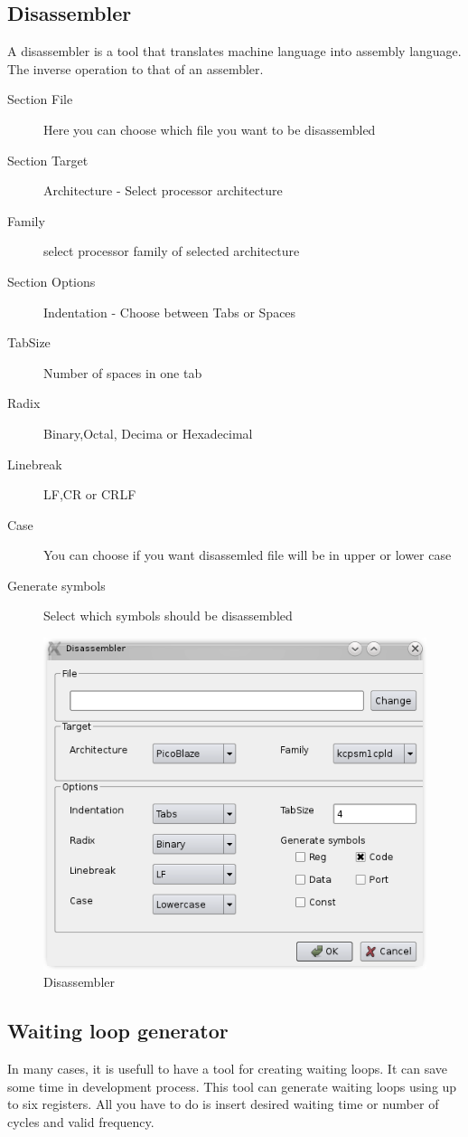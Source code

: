 \subsection{Disassembler}
    A disassembler is a tool that translates machine language into assembly language. The inverse
    operation to that of an assembler.

    \begin{description}
        \item[Section File] Here you can choose which file you want to be disassembled
        \item[Section Target] Architecture - Select processor architecture
        \item[Family] select processor family of selected architecture
        \item[Section Options] Indentation - Choose between Tabs or Spaces
        \item[TabSize] Number of spaces in one tab
        \item[Radix] Binary,Octal, Decima or Hexadecimal
        \item[Linebreak] LF,CR or CRLF
        \item[Case]  You can choose if you want disassemled file will be in upper or lower case
        \item[Generate symbols] Select which symbols should be disassembled
    \end{description}

    \begin{figure}[h]
        \centering{}
        \includegraphics[width=.5\textwidth]{img/disassembler_window.png}
        \caption{Disassembler}
    \end{figure}

\subsection{Waiting loop generator}
    In many cases, it is usefull to have a tool for creating waiting loops. It can save some time in development process. This tool can generate
    waiting loops using up to six registers. All you have to do is insert desired waiting time or number of cycles and valid frequency.

